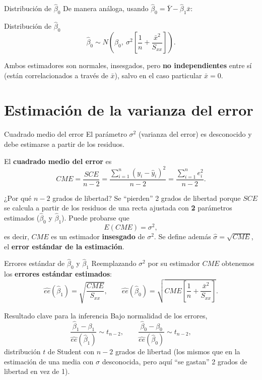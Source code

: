\documentclass[aspectratio=169,11pt]{beamer}
\begin{document}
\begin{frame}{Distribución de $\hat\beta_0$}
De manera análoga, usando $\hat\beta_0 = \bar Y - \hat\beta_1\bar x$:

\begin{block}{Distribución de $\hat\beta_0$}
\[
\hat\beta_0 \sim N\!\left(\beta_0,\ \sigma^2\left[\frac{1}{n}+\frac{\bar x^2}{S_{xx}}\right]\right).
\]
\end{block}

Ambos estimadores son normales, insesgados, pero \textbf{no independientes} entre sí (están correlacionados a través de $\bar x$), salvo en el caso particular $\bar x = 0$.
\end{frame}

\section{Estimación de la varianza del error}

\begin{frame}{Cuadrado medio del error}
El parámetro $\sigma^2$ (varianza del error) es desconocido y debe estimarse a partir de los residuos.

\begin{definition}
El \textbf{cuadrado medio del error} es
\[
CME = \frac{SCE}{n-2} = \frac{\sum_{i=1}^n (y_i-\hat y_i)^2}{n-2} = \frac{\sum_{i=1}^n e_i^2}{n-2}.
\]
\end{definition}

\begin{block}{¿Por qué $n-2$ grados de libertad?}
Se ``pierden'' 2 grados de libertad porque $SCE$ se calcula a partir de los residuos de una recta ajustada con \textbf{2} parámetros estimados ($\hat\beta_0$ y $\hat\beta_1$). Puede probarse que
\[
E(CME) = \sigma^2,
\]
es decir, $CME$ es un estimador \textbf{insesgado} de $\sigma^2$. Se define además $\hat\sigma = \sqrt{CME}$, el \textbf{error estándar de la estimación}.
\end{block}
\end{frame}

\begin{frame}{Errores estándar de $\hat\beta_0$ y $\hat\beta_1$}
Reemplazando $\sigma^2$ por su estimador $CME$ obtenemos los \textbf{errores estándar estimados}:
\[
\widehat{ee}(\hat\beta_1) = \sqrt{\frac{CME}{S_{xx}}}, \qquad
\widehat{ee}(\hat\beta_0) = \sqrt{CME\left[\frac{1}{n}+\frac{\bar x^2}{S_{xx}}\right]}.
\]

\begin{block}{Resultado clave para la inferencia}
Bajo normalidad de los errores,
\[
\frac{\hat\beta_1 - \beta_1}{\widehat{ee}(\hat\beta_1)} \sim t_{n-2}, \qquad
\frac{\hat\beta_0 - \beta_0}{\widehat{ee}(\hat\beta_0)} \sim t_{n-2},
\]
distribución $t$ de Student con $n-2$ grados de libertad (los mismos que en la estimación de una media con $\sigma$ desconocida, pero aquí ``se gastan'' 2 grados de libertad en vez de 1).
\end{block}
\end{frame}
\end{document}
